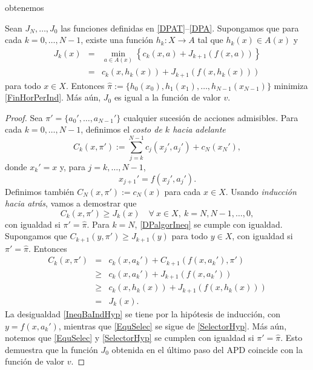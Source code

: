 
obtenemos 

\begin{teo}\label{DynProThe} 
	Sean $J_N,\ldots,J_0$ las funciones definidas en \eqref{DPAT}--\eqref{DPA}. 
    Supongamos que para cada $k=0,\ldots,N-1$, existe una función 
    $h_k:X\to A$ tal que $h_k(x)\in A(x)$ y 
    \begin{eqnarray}
 		J_k(x) 
        & = & \min_{a\in A(x)}\left\{ c_k(x,a) + J_{k+1}(f(x,a))\right\}
 		\nonumber\\
       	& = & c_k(x,h_k(x)) + J_{k+1}(f(x,h_k(x))) \label{SelectorHyp}
    \end{eqnarray}
	para todo $x\in X$.  
    Entonces 
    	$\hat{\pi}:=\{h_0(x_0),h_1(x_1),\ldots,h_{N-1}(x_{N-1})\}$ minimiza 		
    \eqref{FinHorPerInd}. Más aún, $J_0$ es igual a la función de valor $v$.
\end{teo}
\begin{proof}
		Sea $\pi'=\{a_0',\ldots,a_{N-1}'\}$ cualquier sucesión de acciones 
		admisibles. Para cada $k=0,\ldots,N-1$, definimos el 
		{\it costo de $k$ hacia adelante}
    \[ 
    	C_k(x,\pi'):= 
		\sum_{j=k}^{N-1}c_j(x_j',a_j')  +  c_N(x_N'),
    \]
	donde $x_k'=x$ y, para $j=k,\ldots,N-1$,
	\[x_{j+1}'=f(x_j',a_j').\]
	Definimos también 
    $C_N(x,\pi'):=c_N(x)$ 
    para cada $x\in X$. 
    Usando {\it inducción hacia atrás}, vamos a demostrar que
    \begin{equation}\label{DPalgorIneq}
    	C_k(x,\pi')\geq J_k(x) \quad \forall \ x\in X, \ k=N,N-1,\ldots,0,
	\end{equation}
	con igualdad si $\pi'=\hat{\pi}$. 
    Para $k=N$, \eqref{DPalgorIneq} se cumple con igualdad. 
    Supongamos que $C_{k+1}(y,\pi')\geq J_{k+1}(y)$ para todo $y\in X$, 
    con igualdad si $\pi'=\hat{\pi}$. Entonces
    \begin{eqnarray}
		C_k(x,\pi') & = & c_k(x,a_k')+ C_{k+1}(f(x,a_{k}'),\pi') \nonumber\\
            & \geq & c_k(x,a_k')+ J_{k+1}(f(x,a_{k}'))\label{IneqBaIndHyp}\\
    	& \geq & c_k(x,h_k(x)) + J_{k+1}(f(x,h_k(x))) \label{EquSelec}\\
    	&   =  & J_k(x) \nonumber.
	\end{eqnarray}
	La desigualdad \eqref{IneqBaIndHyp} se tiene por la hipótesis de inducción, 
	con $y=f(x,a_k')$, mientras que \eqref{EquSelec} se sigue de 
  \eqref{SelectorHyp}. Más aún, notemos que \eqref{EquSelec} y 
	\eqref{SelectorHyp} se cumplen con 	igualdad si $\pi'=\hat{\pi}$. Esto 
	demuestra que la función $J_0$ obtenida 	en el último paso del APD coincide 
	con la función de valor $v$.
\end{proof}


